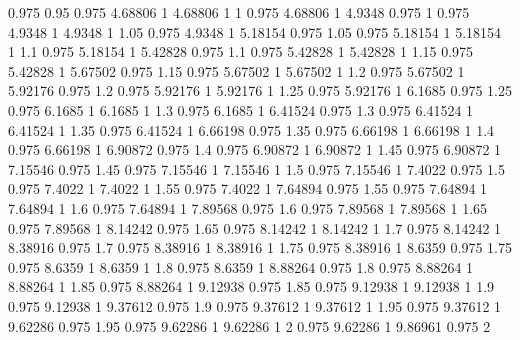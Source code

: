 0.975 0.95
0.975 4.68806
1 4.68806
1 1
0.975 4.68806
1 4.9348
0.975 1
0.975 4.9348
1 4.9348
1 1.05
0.975 4.9348
1 5.18154
0.975 1.05
0.975 5.18154
1 5.18154
1 1.1
0.975 5.18154
1 5.42828
0.975 1.1
0.975 5.42828
1 5.42828
1 1.15
0.975 5.42828
1 5.67502
0.975 1.15
0.975 5.67502
1 5.67502
1 1.2
0.975 5.67502
1 5.92176
0.975 1.2
0.975 5.92176
1 5.92176
1 1.25
0.975 5.92176
1 6.1685
0.975 1.25
0.975 6.1685
1 6.1685
1 1.3
0.975 6.1685
1 6.41524
0.975 1.3
0.975 6.41524
1 6.41524
1 1.35
0.975 6.41524
1 6.66198
0.975 1.35
0.975 6.66198
1 6.66198
1 1.4
0.975 6.66198
1 6.90872
0.975 1.4
0.975 6.90872
1 6.90872
1 1.45
0.975 6.90872
1 7.15546
0.975 1.45
0.975 7.15546
1 7.15546
1 1.5
0.975 7.15546
1 7.4022
0.975 1.5
0.975 7.4022
1 7.4022
1 1.55
0.975 7.4022
1 7.64894
0.975 1.55
0.975 7.64894
1 7.64894
1 1.6
0.975 7.64894
1 7.89568
0.975 1.6
0.975 7.89568
1 7.89568
1 1.65
0.975 7.89568
1 8.14242
0.975 1.65
0.975 8.14242
1 8.14242
1 1.7
0.975 8.14242
1 8.38916
0.975 1.7
0.975 8.38916
1 8.38916
1 1.75
0.975 8.38916
1 8.6359
0.975 1.75
0.975 8.6359
1 8.6359
1 1.8
0.975 8.6359
1 8.88264
0.975 1.8
0.975 8.88264
1 8.88264
1 1.85
0.975 8.88264
1 9.12938
0.975 1.85
0.975 9.12938
1 9.12938
1 1.9
0.975 9.12938
1 9.37612
0.975 1.9
0.975 9.37612
1 9.37612
1 1.95
0.975 9.37612
1 9.62286
0.975 1.95
0.975 9.62286
1 9.62286
1 2
0.975 9.62286
1 9.86961
0.975 2
